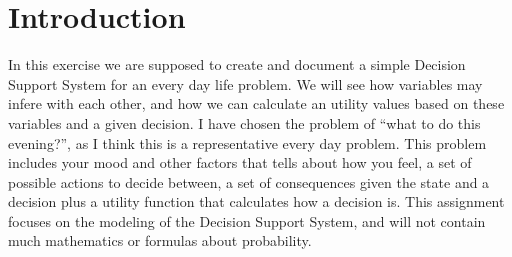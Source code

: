 \section{Introduction}
In this exercise we are supposed to create and document a simple Decision
Support System for an every day life problem. We will see how variables may
infere with each other, and how we can calculate an utility values based on
these variables and a given decision. I have chosen the problem of ``what to do
this evening?'', as I think this is a representative every day problem. This
problem includes your mood and other factors that tells about how you feel, a
set of possible actions to decide between, a set of consequences given the 
state and a decision plus a utility function that calculates how a decision is.
This assignment focuses on the modeling of the Decision Support System, and will
not contain much mathematics or formulas about probability.
